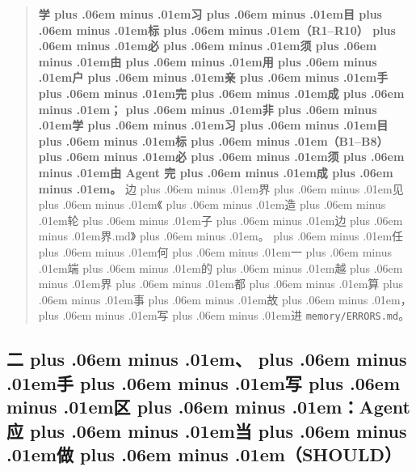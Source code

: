 \documentclass[
]{article}
\newcommand{\passthrough}[1]{#1}
\def\zh#1{{\zhfont #1}}
\def\zhglue{\hskip0pt plus .06em minus .01em}
\begin{document}
\begin{quote}
\textbf{\zh{学\zhglue 习\zhglue 目\zhglue 标\zhglue （}R1--R10\zh{）\zhglue 必\zhglue 须\zhglue 由\zhglue 用\zhglue 户\zhglue 亲\zhglue 手\zhglue 完\zhglue 成\zhglue ；\zhglue 非\zhglue 学\zhglue 习\zhglue 目\zhglue 标\zhglue （}B1--B8\zh{）\zhglue 必\zhglue 须\zhglue 由} Agent \zh{完\zhglue 成\zhglue 。}} \zh{边\zhglue 界\zhglue 见\zhglue 《\zhglue 造\zhglue 轮\zhglue 子\zhglue 边\zhglue 界}.md\zh{》\zhglue 。\zhglue 任\zhglue 何\zhglue 一\zhglue 端\zhglue 的\zhglue 越\zhglue 界\zhglue 都\zhglue 算\zhglue 事\zhglue 故\zhglue ，\zhglue 写\zhglue 进} \passthrough{\lstinline!memory/ERRORS.md!}\zh{。}
\end{quote}

\subsection{\zh{二\zhglue 、\zhglue 手\zhglue 写\zhglue 区\zhglue ：}Agent \zh{应\zhglue 当\zhglue 做\zhglue （}SHOULD\zh{）}}\label{ux4e8cux624bux5199ux533aagent-ux5e94ux5f53ux505ashould}
\end{document}
